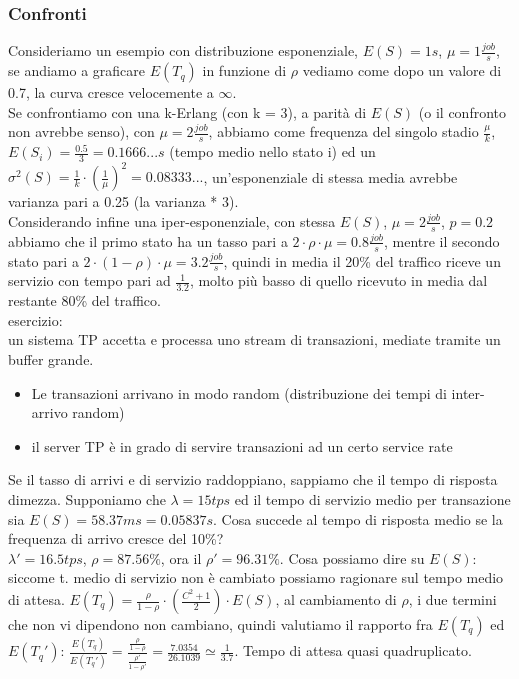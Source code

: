 \documentclass{article}
\begin{document}
\subsubsection{Confronti}
Consideriamo un esempio con distribuzione esponenziale, $E(S) = 1s$, $\mu = 1 \frac{job}{s}$, se andiamo a graficare $E(T_q)$ in funzione di $\rho$ vediamo come dopo un valore di 0.7, la curva cresce velocemente a $\infty$.\\ Se confrontiamo con una k-Erlang (con k = 3), a parità di $E(S)$ (o il confronto non avrebbe senso), con $\mu = 2 \frac{job}{s}$, abbiamo come frequenza del singolo stadio $\frac{\mu}{k}$, $E(S_i) = \frac{0.5}{3} = 0.1666... s$ (tempo medio nello stato i) ed un $\sigma^2(S) = \frac{1}{k}\cdot (\frac{1}{\mu})^2 = 0.08333...$, un'esponenziale di stessa media avrebbe varianza pari a 0.25 (la varianza * 3).\\ Considerando infine una iper-esponenziale, con stessa $E(S)$, $\mu = 2 \frac{job}{s}$, $p = 0.2$ abbiamo che il primo stato ha un tasso pari a $2\cdot \rho\cdot \mu = 0.8 \frac{job}{s}$, mentre il secondo stato pari a $2\cdot(1 - \rho)\cdot \mu = 3.2 \frac{job}{s}$, quindi in media il 20\% del traffico riceve un servizio con tempo pari ad $\frac{1}{3.2}$, molto più basso di quello ricevuto in media dal restante 80\% del traffico.\\ esercizio:\\ un sistema TP accetta e processa uno stream di transazioni, mediate tramite un buffer grande.
\begin{itemize}
\item Le transazioni arrivano in modo random (distribuzione dei tempi di inter-arrivo random)\\
\item il server TP è in grado di servire transazioni ad un certo service rate
\end{itemize}
Se il tasso di arrivi e di servizio raddoppiano, sappiamo che il tempo di risposta dimezza. Supponiamo che $\lambda = 15 tps$ ed il tempo di servizio medio per transazione sia $E(S) = 58.37ms = 0.05837 s$. Cosa succede al tempo di risposta medio se la frequenza di arrivo cresce del 10\%?\\ $\lambda' = 16.5 tps$, $\rho = 87.56\%$, ora il $\rho' = 96.31\%$. Cosa possiamo dire su $E(S)$: siccome t. medio di servizio non è cambiato possiamo ragionare sul tempo medio di attesa. $E(T_q) = \frac{\rho}{1 - \rho}\cdot (\frac{C^2 + 1}{2})\cdot E(S)$, al cambiamento di $\rho$, i due termini che non vi dipendono non cambiano, quindi valutiamo il rapporto fra $E(T_q)$ ed $E(T_q')$: $\frac{E(T_q)}{E(T_q')} = \frac{\frac{\rho}{1 - \rho}}{\frac{\rho'}{1 - \rho'}} = \frac{7.0354}{26.1039} \simeq \frac{1}{3.7}$. Tempo di attesa quasi quadruplicato.
\end{document}
